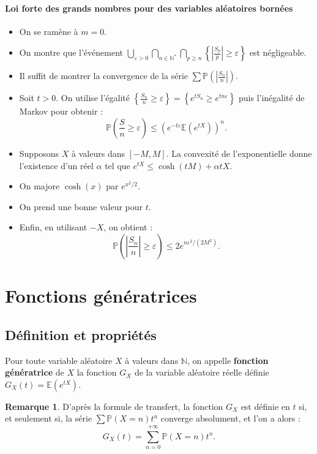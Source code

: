 \documentclass[french]{article}
\renewcommand{\P}{\mathbb{P}}
\newcommand{\N}{\mathbb{N}}
\newcommand{\st}{^*}
\newcommand{\E}{\mathbb{E}}
\theoremstyle{plain}
\theoremstyle{definition}
\newtheorem*{rmq}{Remarque}
\theoremstyle{remark}
\begin{document}
\paragraph{Loi forte des grands nombres pour des variables aléatoires bornées}
\begin{itemize}
	\item On se ramène à $m=0$.
	\item On montre que l'événement $\displaystyle\bigcup_{\varepsilon>0}\bigcap_{n\in\N\st}\bigcap_{p\geqslant n}\left\{\left\lvert\frac{S_p}{p}\right\rvert\geqslant\varepsilon\right\}$ est négligeable.
	\item Il suffit de montrer la convergence de la série $\displaystyle\sum\P\left(\left\lvert\frac{S_n}{n}\right\rvert\right)$.
	\item Soit $t>0$. On utilise l'égalité $\displaystyle\left\{\frac{S_n}{n}\geqslant\varepsilon\right\}=\left\{e^{tS_n}\geqslant e^{tn\varepsilon}\right\}$ puis l'inégalité de Markov pour obtenir : $$\P\left(\frac{S}{n}\geqslant\varepsilon\right)\leqslant(e^{-t\varepsilon}\E(e^{tX}))^n.$$
	\item Supposons $X$ à valeurs dans $[-M,M]$. La convexité de l'exponentielle donne l'existence d'un réel $\alpha$ tel que $e^{tX}\leqslant\cosh(tM)+\alpha tX$.
	\item On majore $\cosh(x)$ par $e^{x^2/2}$.
	\item On prend une bonne valeur pour $t$.
	\item Enfin, en utilisant $-X$, on obtient : $$\P\left(\left\lvert\frac{S_n}{n}\right\rvert\geqslant\varepsilon\right)\leqslant2e^{n\varepsilon^2/(2M^2)}.$$
\end{itemize}

\section{Fonctions génératrices}

\subsection{Définition et propriétés}

\begin{dfn}
	Pour toute variable aléatoire $X$ à valeurs dans $\N$, on appelle \textbf{fonction génératrice} de $X$ la fonction $G_X$ de la variable aléatoire réelle définie $G_X(t)=\E(e^{tX})$.
\end{dfn}

\begin{rmq}
	D'après la formule de transfert, la fonction $G_X$ est définie en $t$ si, et seulement si, la série $\displaystyle\sum\P(X=n)t^n$ converge absolument, et l'on a alors :
	$$G_X(t)=\sum_{n=0}^{+\infty}\P(X=n)t^n.$$
\end{rmq}
\end{document}
